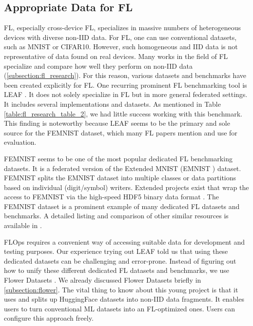 \subsection{Appropriate Data for FL}

FL, especially cross-device FL, specializes in massive numbers of heterogeneous devices with diverse non-IID data.
For FL, one can use conventional datasets, such as MNIST or CIFAR10.
However, such homogeneous and IID data is not representative of data found on real devices.
Many works in the field of FL specialize and compare how well they perform on non-IID data (\ref{subsection:fl_research}).
For this reason, various datasets and benchmarks have been created explicitly for FL.
One recurring prominent FL benchmarking tool is LEAF \cite{paper:leaf_fl_benchmark}.
It does not solely specialize in FL but in more general federated settings.
It includes several implementations and datasets.
As mentioned in Table \ref{table:fl_research_table_2}, we had little success working with this benchmark.
This finding is noteworthy because LEAF seems to be the primary and sole source for the FEMNIST dataset, which many FL papers mention and use for evaluation.

FEMNIST seems to be one of the most popular dedicated FL benchmarking datasets.
It is a federated version of the Extended MNIST (EMNIST \cite{emnist_dataset}) dataset.
FEMNIST splits the EMNIST dataset into multiple classes or data partitions based on individual (digit/symbol) writers.
Extended projects exist that wrap the access to FEMNIST via the high-speed HDF5 binary data format \cite{hdf5_femnist}.
The FEMNIST dataset is a prominent example of many dedicated FL datasets and benchmarks.
A detailed listing and comparison of other similar resources is available in \cite{thesis:tum_fl_framework_comparison}.

FLOps requires a convenient way of accessing suitable data for development and testing purposes.
Our experience trying out LEAF told us that using these dedicated datasets can be challenging and error-prone.
Instead of figuring out how to unify these different dedicated FL datasets and benchmarks, we use Flower Datasets \cite{flower:datasets}.
We already discussed Flower Datasets briefly in \ref{subsection:flower}.
The vital thing to know about this young project is that it uses and splits up HuggingFace datasets into non-IID data fragments.
It enables users to turn conventional ML datasets into an FL-optimized ones.
Users can configure this approach freely.